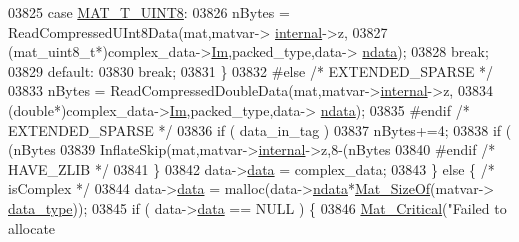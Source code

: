 \begin{DoxyCode}
{{{{{{{{{{{{{{{{{{03825                         \textcolor{keywordflow}{case} \hyperlink{group___m_a_t_ggacf7b3b879282b7ab3a51190e49bf3453a01c1bd7db68f90552862eb5d311be408}{MAT\_T\_UINT8}:
03826                             nBytes = ReadCompressedUInt8Data(mat,matvar->
      \hyperlink{group___m_a_t_a6e97e3ed9f40c49322c18561c2a94e92}{internal}->z,
03827                                  (mat\_uint8\_t*)complex\_data->\hyperlink{group___m_a_t_a7182d10b0d3598415887376065440946}{Im},packed\_type,data->
      \hyperlink{group___m_a_t_a1beb8a8c58a808207cbea650563a9b63}{ndata});
03828                             \textcolor{keywordflow}{break};
03829                         \textcolor{keywordflow}{default}:
03830                             \textcolor{keywordflow}{break};
03831                     \}
03832 \textcolor{preprocessor}{#else    }\textcolor{comment}{/* EXTENDED\_SPARSE */}\textcolor{preprocessor}{}
03833                     nBytes = ReadCompressedDoubleData(mat,matvar->\hyperlink{group___m_a_t_a6e97e3ed9f40c49322c18561c2a94e92}{internal}->z,
03834                                  (\textcolor{keywordtype}{double}*)complex\_data->\hyperlink{group___m_a_t_a7182d10b0d3598415887376065440946}{Im},packed\_type,data->
      \hyperlink{group___m_a_t_a1beb8a8c58a808207cbea650563a9b63}{ndata});
03835 \textcolor{preprocessor}{#endif    }\textcolor{comment}{/* EXTENDED\_SPARSE */}\textcolor{preprocessor}{}
03836                     \textcolor{keywordflow}{if} ( data\_in\_tag )
03837                         nBytes+=4;
03838                     \textcolor{keywordflow}{if} ( (nBytes %
03839                         InflateSkip(mat,matvar->\hyperlink{group___m_a_t_a6e97e3ed9f40c49322c18561c2a94e92}{internal}->z,8-(nBytes %
03840 \textcolor{preprocessor}{#endif    }\textcolor{comment}{/* HAVE\_ZLIB */}\textcolor{preprocessor}{}
03841                 \}
03842                 data->\hyperlink{group___m_a_t_ae2c648cb9eac4ce47f26cddb44246152}{data} = complex\_data;
03843             \} \textcolor{keywordflow}{else} \{ \textcolor{comment}{/* isComplex */}
03844                 data->\hyperlink{group___m_a_t_ae2c648cb9eac4ce47f26cddb44246152}{data} = malloc(data->\hyperlink{group___m_a_t_a1beb8a8c58a808207cbea650563a9b63}{ndata}*\hyperlink{group__mat__util_gab6774aabdc124c540c1e7686d0804940}{Mat\_SizeOf}(matvar->
      \hyperlink{group___m_a_t_ab6aafe9bd77f0f077852593dec438144}{data\_type}));
03845                 \textcolor{keywordflow}{if} ( data->\hyperlink{group___m_a_t_ae2c648cb9eac4ce47f26cddb44246152}{data} == NULL ) \{
03846                     \hyperlink{group__mat__util_gaf51f2bfbb5580f575e4dd79757e2b80c}{Mat\_Critical}(\textcolor{stringliteral}{"Failed to allocate %
}}}}}}}}}}}}}}}}}}}
\end{DoxyCode}
